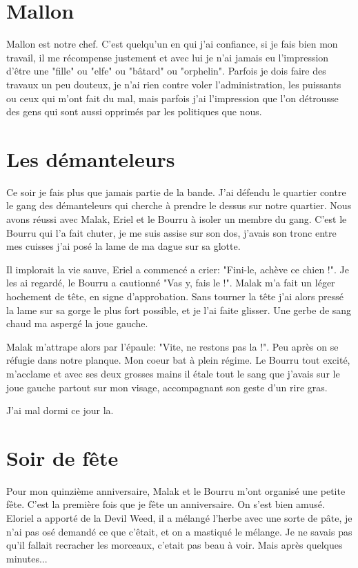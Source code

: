 \documentclass[10pt,a4paper,twoside,twocolumn,openany]{book}
\begin{document}
\section{Mallon}
Mallon est notre chef. C'est quelqu'un en qui j'ai confiance, si je fais bien mon travail, il me
récompense justement et avec lui je n'ai jamais eu l'impression d'être une "fille" ou "elfe" ou
"bâtard" ou "orphelin". Parfois je dois faire des travaux un peu douteux, je n'ai rien contre voler
l'administration, les puissants ou ceux qui m'ont fait du mal, mais parfois j'ai l'impression que l'on
détrousse des gens qui sont aussi opprimés par les politiques que nous.

\section{Les démanteleurs}

Ce soir je fais plus que jamais partie de la bande. J'ai défendu le quartier contre le gang des
démanteleurs qui cherche à prendre le dessus sur notre quartier.
Nous avons réussi avec Malak, Eriel et le Bourru à isoler un membre du gang. C'est le Bourru
qui l'a fait chuter, je me suis assise sur son dos, j'avais son tronc entre mes cuisses j'ai posé 
la lame de ma dague sur sa glotte. 

Il implorait la vie sauve, Eriel a commencé a crier: "Fini-le, achève ce chien !". Je les ai regardé,
le Bourru a cautionné "Vas y, fais le !". Malak m'a fait un léger hochement de tête, en signe
d'approbation. Sans tourner la tête j'ai alors pressé la lame sur sa gorge le plus fort possible,
et je l'ai faite glisser. Une gerbe de sang chaud ma aspergé la joue gauche.

Malak m'attrape alors par l'épaule: "Vite, ne restons pas la !". Peu après on se réfugie dans notre planque.
Mon coeur bat à plein régime. Le Bourru tout excité, m'acclame et avec ses deux grosses mains il étale
tout le sang que j'avais sur le joue gauche partout sur mon visage, accompagnant son geste d'un rire gras. 

J'ai mal dormi ce jour la.

\section{Soir de fête}

Pour mon quinzième anniversaire, Malak et le Bourru m'ont organisé une petite fête. C'est la première fois
que je fête un anniversaire. On s'est bien amusé. Eloriel a apporté de la Devil Weed, il a mélangé
l'herbe avec une sorte de pâte, je n'ai pas osé demandé ce que c'êtait, et on a mastiqué le mélange.
Je ne savais pas qu'il fallait recracher les morceaux, c'etait
pas beau à voir. Mais après quelques minutes...
\end{document}
